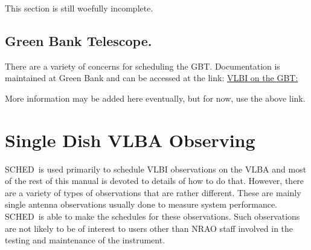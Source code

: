 \documentclass{report}
\newcommand{\schedb}{{\sc SCHED~}}
\begin{document}
This section is still woefully incomplete.


\subsection{\label{SSEC:GBT}Green Bank Telescope.}

There are a variety of concerns for scheduling the GBT.  Documentation
is maintained at Green Bank and can be accessed at the link:
{\href{http://www.gb.nrao.edu/~fghigo/gbtdoc/vlbinfo.html\#hifreq}{VLBI on the GBT:}}

More information may be added here eventually, but for now, use the
above link.

\section{\label{SEC:SPECIALVLBA}Single Dish VLBA Observing}

\schedb is used primarily to schedule VLBI observations on the VLBA
and most of the rest of this manual is devoted to details of how to
do that.  However, there are a variety of types of observations that
are rather different.  These are mainly single antenna observations
usually done to measure system performance.  \schedb is able to
make the schedules for these observations.  Such observations are
not likely to be of interest to users other than NRAO staff involved
in the testing and maintenance of the instrument.
\end{document}
